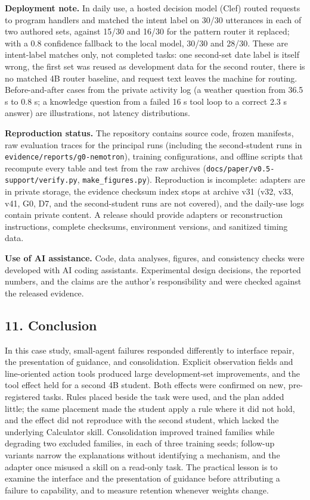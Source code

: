 \documentclass[
  10pt,
]{article}
\begin{document}
\textbf{Deployment note.} In daily use, a hosted decision model (Clef)
routed requests to program handlers and matched the intent label on
30/30 utterances in each of two authored sets, against 15/30 and 16/30
for the pattern router it replaced; with a 0.8 confidence fallback to
the local model, 30/30 and 28/30. These are intent-label matches only,
not completed tasks: one second-set date label is itself wrong, the
first set was reused as development data for the second router, there is
no matched 4B router baseline, and request text leaves the machine for
routing. Before-and-after cases from the private activity log (a weather
question from 36.5 s to 0.8 s; a knowledge question from a failed 16 s
tool loop to a correct 2.3 s answer) are illustrations, not latency
distributions.

\textbf{Reproduction status.} The repository contains source code,
frozen manifests, raw evaluation traces for the principal runs
(including the second-student runs in
\texttt{evidence/reports/g0-nemotron}), training configurations, and
offline scripts that recompute every table and test from the raw
archives (\texttt{docs/paper/v0.5-support/verify.py},
\texttt{make\_figures.py}). Reproduction is incomplete: adapters are in
private storage, the evidence checksum index stops at archive v31 (v32,
v33, v41, G0, D7, and the second-student runs are not covered), and the
daily-use logs contain private content. A release should provide
adapters or reconstruction instructions, complete checksums, environment
versions, and sanitized timing data.

\textbf{Use of AI assistance.} Code, data analyses, figures, and
consistency checks were developed with AI coding assistants.
Experimental design decisions, the reported numbers, and the claims are
the author's responsibility and were checked against the released
evidence.

\subsection{11. Conclusion}\label{conclusion}

In this case study, small-agent failures responded differently to
interface repair, the presentation of guidance, and consolidation.
Explicit observation fields and line-oriented action tools produced
large development-set improvements, and the tool effect held for a
second 4B student. Both effects were confirmed on new, pre-registered
tasks. Rules placed beside the task were used, and the plan added
little; the same placement made the student apply a rule where it did
not hold, and the effect did not reproduce with the second student,
which lacked the underlying Calculator skill. Consolidation improved
trained families while degrading two excluded families, in each of three
training seeds; follow-up variants narrow the explanations without
identifying a mechanism, and the adapter once misused a skill on a
read-only task. The practical lesson is to examine the interface and the
presentation of guidance before attributing a failure to capability, and
to measure retention whenever weights change.
\end{document}
